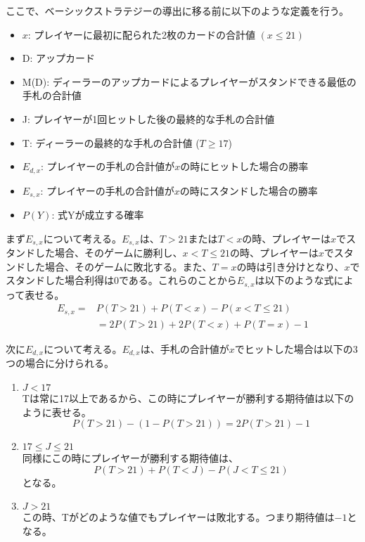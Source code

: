         ここで、ベーシックストラテジーの導出に移る前に以下のような定義を行う。
        \begin{itemize}
            \item[] $x$: プレイヤーに最初に配られた2枚のカードの合計値 \((x \leq 21)\)
            \item[] D: アップカード
            \item[] M(D): ディーラーのアップカードによるプレイヤーがスタンドできる最低の手札の合計値
            \item[] J: プレイヤーが1回ヒットした後の最終的な手札の合計値
            \item[] T: ディーラーの最終的な手札の合計値 (\(T \geq 17\))
            \item[] \(E_{d,x}\): プレイヤーの手札の合計値が$x$の時にヒットした場合の勝率
            \item[] \(E_{s,x}\): プレイヤーの手札の合計値が$x$の時にスタンドした場合の勝率
            \item[] \(P(Y)\): 式Yが成立する確率
        \end{itemize}

        まず\(E_{s,x}\)について考える。\(E_{s,x}\)は、\(T > 21 \)または\(T < x\)の時、プレイヤーは$x$でスタンドした場合、そのゲームに勝利し、\(x < T \leq 21\)の時、プレイヤーは$x$でスタンドした場合、そのゲームに敗北する。また、\(T = x\)の時は引き分けとなり、$x$でスタンドした場合利得は$0$である。これらのことから\(E_{s,x}\)は以下のような式によって表せる。
        \begin{displaymath}
            \begin{split}
                E_{s,x} = &P(T > 21) + P(T < x) - P(x < T \leq 21)\\
                &= 2P(T > 21) + 2P(T < x) + P(T = x) - 1
            \end{split}
        \end{displaymath}
        
        次に\(E_{d,x}\)について考える。\(E_{d,x}\)は、手札の合計値が$x$でヒットした場合は以下の3つの場合に分けられる。
        \begin{enumerate}
            \item \(J < 17\)\\
                Tは常に17以上であるから、この時にプレイヤーが勝利する期待値は以下のように表せる。
                $$P(T > 21) - (1 - P(T > 21)) = 2P(T > 21) - 1$$
            \item \(17 \leq J \leq 21\)\\
                同様にこの時にプレイヤーが勝利する期待値は、
                $$P(T > 21) + P(T < J) - P(J < T \leq 21)$$
                となる。
            \item \(J > 21\)\\
                この時、Tがどのような値でもプレイヤーは敗北する。つまり期待値は$-1$となる。
        \end{enumerate}


